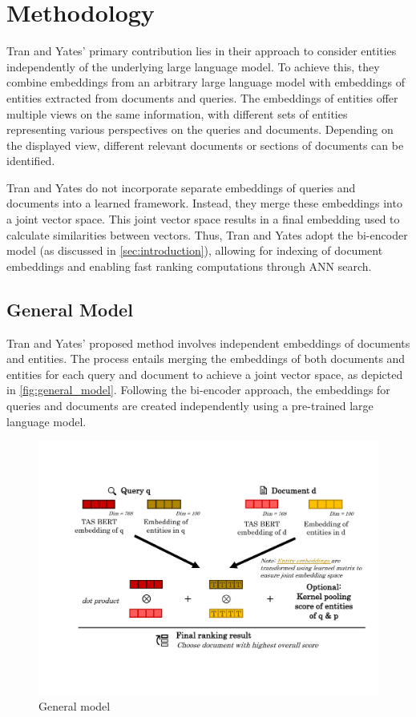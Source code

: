 \section{Methodology}\label{sec:methods}

Tran and Yates' primary contribution lies in their approach to consider entities independently of the underlying large language model. To achieve this, they combine embeddings from an arbitrary large language model with embeddings of entities extracted from documents and queries. The embeddings of entities offer multiple views on the same information, with different sets of entities representing various perspectives on the queries and documents. Depending on the displayed view, different relevant documents or sections of documents can be identified.

Tran and Yates do not incorporate separate embeddings of queries and documents into a learned framework. Instead, they merge these embeddings into a joint vector space. This joint vector space results in a final embedding used to calculate similarities between vectors. Thus, Tran and Yates adopt the bi-encoder model (as discussed in \autoref{sec:introduction}), allowing for indexing of document embeddings and enabling fast ranking computations through ANN search. 

\subsection{General Model}\label{subsec:general_model}

Tran and Yates' proposed method involves independent embeddings of documents and entities. The process entails merging the embeddings of both documents and entities for each query and document to achieve a joint vector space, as depicted in \autoref{fig:general_model}. Following the bi-encoder approach, the embeddings for queries and documents are created independently using a pre-trained large language model.

\begin{figure}[!htb]
    \includegraphics[trim={1.5cm 3cm 1.5cm 3cm}, clip, width=\textwidth]{resources/general_model} 
    \caption{General model}
    \label{fig:general_model}
\end{figure}

